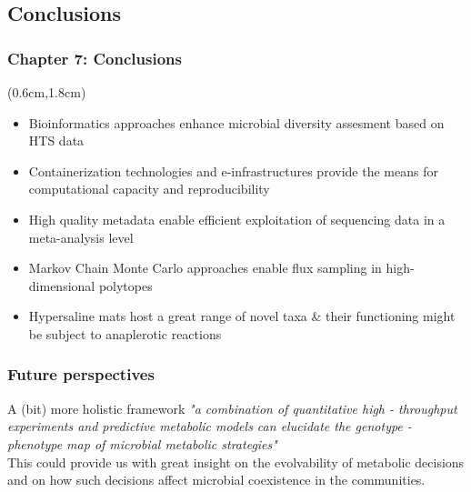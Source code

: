 \documentclass{beamer}
\begin{document}
   \begin{darkframes}
      \section{
         Conclusions
      }

   \begin{frame}
      \frametitle{\textbf{Chapter 7: } Conclusions}
      \begin{singlespace}
      \begin{textblock*}{11cm}(0.6cm,1.8cm)
      \small 
      \begin{itemize}
      
         \item Bioinformatics approaches enhance microbial diversity assesment based on HTS data
         \bigskip
         \item Containerization technologies and e-infrastructures provide the means for computational capacity and reproducibility
         \bigskip
         \item High quality metadata enable efficient exploitation of sequencing data in a meta-analysis level
         \bigskip
         \item Markov Chain Monte Carlo approaches enable flux sampling in high-dimensional polytopes 
         \bigskip
         \item Hypersaline mats host a great range of novel taxa \& their functioning might be subject to anaplerotic reactions
      \end{itemize}
      \end{textblock*}
   \end{singlespace}
   \end{frame}

   \begin{frame}
      \frametitle{Future perspectives}

      \begin{block}{A (bit) more holistic framework}
         \small
         \textit{
            "a combination of quantitative high - throughput experiments and predictive metabolic
            models can elucidate the genotype - phenotype map of microbial metabolic strategies"
         }\\
         \bigskip
         This could provide us with great insight on the evolvability of metabolic decisions and on how such 
         decisions affect microbial coexistence in the communities. 
         
      \end{block}

   \end{frame}
   \end{darkframes}
\end{document}
